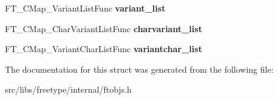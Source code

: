 \begin{DoxyCompactItemize}
\item 
\hypertarget{struct_f_t___c_map___class_rec___ad61635444cbfc71c4259e74cb892c172}{
FT\_\-CMap\_\-VariantListFunc {\bfseries variant\_\-list}}
\label{struct_f_t___c_map___class_rec___ad61635444cbfc71c4259e74cb892c172}

\item 
\hypertarget{struct_f_t___c_map___class_rec___a65db9dfa0e29b7de257dc8870532ab19}{
FT\_\-CMap\_\-CharVariantListFunc {\bfseries charvariant\_\-list}}
\label{struct_f_t___c_map___class_rec___a65db9dfa0e29b7de257dc8870532ab19}

\item 
\hypertarget{struct_f_t___c_map___class_rec___ac1563590a0bac99082aa0996b94aad57}{
FT\_\-CMap\_\-VariantCharListFunc {\bfseries variantchar\_\-list}}
\label{struct_f_t___c_map___class_rec___ac1563590a0bac99082aa0996b94aad57}

\end{DoxyCompactItemize}


The documentation for this struct was generated from the following file:\begin{DoxyCompactItemize}
\item 
src/libs/freetype/internal/ftobjs.h\end{DoxyCompactItemize}
